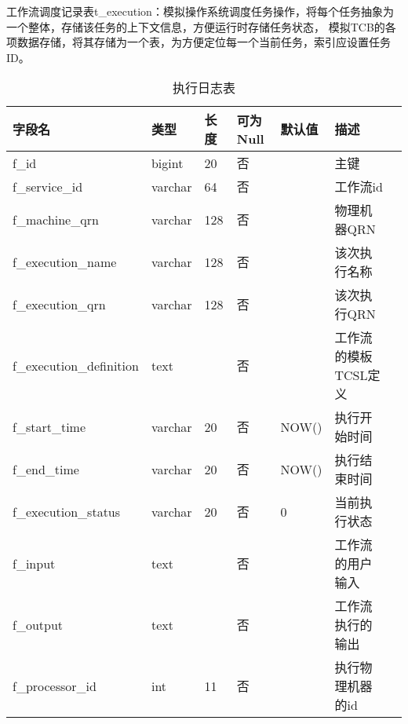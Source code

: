 工作流调度记录表t\_execution：模拟操作系统调度任务操作，将每个任务抽象为一个整体，存储该任务的上下文信息，方便运行时存储任务状态，
模拟TCB的各项数据存储，将其存储为一个表，为方便定位每一个当前任务，索引应设置任务ID。
\begin{table}[H]
    \centering
    \caption{执行日志表}
    \label{tab:t_execution}
    \begin{tabular}{lllllll}
        \toprule
        字段名	&类型	&长度	&可为Null &默认值	&描述 \\
        \midrule
        f\_id	&bigint	&20 &否 & &主键 \\
        f\_service\_id	&varchar	&64 &否 & &工作流id \\
        f\_machine\_qrn	&varchar	&128 &否 & &物理机器QRN \\
        f\_execution\_name	&varchar	&128 &否 & &该次执行名称 \\
        f\_execution\_qrn	&varchar	&128 &否 & &该次执行QRN \\
        f\_execution\_definition	&text	& &否 & &工作流的模板TCSL定义 \\
        f\_start\_time	&varchar	&20 &否 & NOW()&执行开始时间 \\
        f\_end\_time	&varchar	&20 &否 & NOW()&执行结束时间 \\
        f\_execution\_status	&varchar	&20 &否 &0 &当前执行状态\\
        f\_input	&text	& &否 & &工作流的用户输入 \\
        f\_output	&text	& &否 & &工作流执行的输出 \\
        f\_processor\_id	&int	&11 &否 & &执行物理机器的id \\
        \bottomrule
    \end{tabular}
\end{table}


